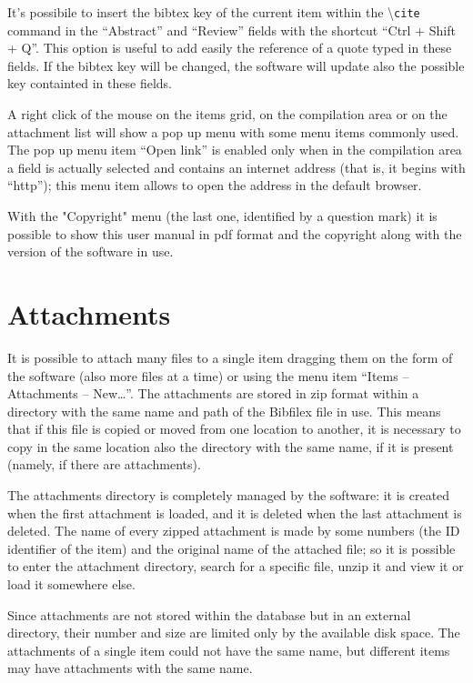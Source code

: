 \documentclass[a4paper,12pt]{report}
\begin{document}
It's possibile to insert the bibtex key of the current item within the \textbackslash \texttt{cite} command in the “Abstract” and “Review” fields with the shortcut “Ctrl + Shift + Q”. This option is useful to add easily the reference of a quote typed in these fields. If the bibtex key will be changed, the software will update also the possible key containted in these fields.

A right click of the mouse on the items grid, on the compilation area or on the attachment list will show a pop up menu with some menu items commonly used. The pop up menu item “Open link” is enabled only when in the compilation area a field is actually selected and contains an internet address (that is, it begins with “http”); this menu item allows to open the address in the default browser. 

With the "Copyright" menu (the last one, identified by a question mark) it is possible to show this user manual in pdf format and the copyright along with the version of the software in use.

\section{Attachments}

It is possible to attach many files to a single item dragging them on the form of the software (also more files at a time) or using the menu item “Items -- Attachments -- New\dots”. The attachments are stored in zip format within a directory with the same name and path of the Bibfilex file in use. This means that if this file is copied or moved from one location to another, it is necessary to copy in the same location also the directory with the same name, if it is present (namely, if there are attachments).

The attachments directory is completely managed by the software: it is created when the first attachment is loaded, and it is deleted when the last attachment is deleted. The name of every zipped attachment is made by some numbers (the ID identifier of the item) and the original name of the attached file; so it is possible to enter the attachment directory, search for a specific file, unzip it and view it or load it somewhere else.

Since attachments are not stored within the database but in an external directory, their number and size are limited only by the available disk space. The attachments of a single item could not have the same name, but different items may have attachments with the same name.
\end{document}
